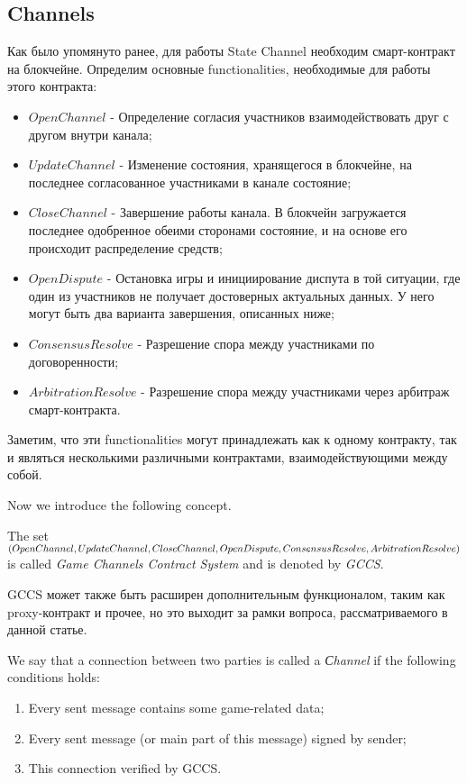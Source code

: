 	\subsection{Channels}
Как было упомянуто ранее, для работы State Channel необходим смарт-контракт на блокчейне. Определим основные functionalities, необходимые для работы этого контракта:
\begin{itemize}
	\item $ OpenChannel $ - Определение согласия участников взаимодействовать друг с другом внутри канала;
	\item $ UpdateChannel $ - Изменение состояния, хранящегося в блокчейне, на последнее согласованное участниками в канале состояние;
	\item $ CloseChannel $ - Завершение работы канала. В блокчейн загружается последнее одобренное обеими сторонами состояние, и на основе его происходит распределение средств;
	\item $ OpenDispute $ - Остановка игры и инициирование диспута в той ситуации, где один из участников не получает достоверных актуальных данных. У него могут быть два варианта завершения, описанных ниже;
	\item $ ConsensusResolve $ - Разрешение спора между участниками по договоренности;
	\item $ ArbitrationResolve $ - Разрешение спора между участниками через арбитраж смарт-контракта. 
\end{itemize}
\begin{remark}
Заметим, что эти functionalities могут принадлежать как к одному контракту, так и являться несколькими различными контрактами, взаимодействующими между собой.
\end{remark}
Now we introduce the following concept. 
\begin{defn}
The set $ (OpenChannel, UpdateChannel, CloseChannel,\\ OpenDispute,  ConsensusResolve, ArbitrationResolve) $
is called \textit {Game Channels Contract System} and is denoted by \textit {GCCS}. 
\begin{remark}
GCCS может также быть расширен дополнительным функционалом, таким как proxy-контракт и прочее, но это выходит за рамки вопроса, рассматриваемого в данной статье. 
\end{remark}
\end{defn}
\begin{defn}
We say that a connection between two parties is called a \textit {Сhannel} if the following conditions holds:
	\begin{enumerate}
		\item Every sent message contains some game-related data;
		\item Every sent message (or main part of this message) signed by sender;
		\item This connection verified by GCCS. 
	\end{enumerate}
\end{defn}

